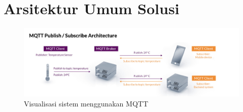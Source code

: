 \chapter{Arsitektur Umum Solusi}
\label{appendix:gambaran-umum-solusi}

\begin{figure}[h]
  \centering
  \includegraphics[width=1\textwidth]{resources/appendix/arsitektur-mqtt.jpg}
  \caption{Visualisasi sistem menggunakan MQTT \parencite{mqtt}}
  \label{fig:mqtt-architecture-image}
\end{figure}


